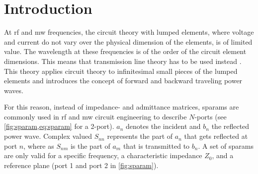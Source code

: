 \documentclass[12pt,a4paper,parskip=full,abstract=true,BCOR=10mm,twoside,open=right]{scrreprt}
\begin{document}
\renewcommand{\abstractname}{Acknowledgements}
\begin{abstract}
    \lipsum[1]
\end{abstract}

\tableofcontents

\chapter{Introduction}
\label{chap:introduction}

At \gls{rf} and \gls{mw} frequencies, the circuit theory with lumped elements, where
voltage and current do not vary over the physical dimension of the elements, is of limited
value. The wavelength at these frequencies is of the order of the circuit
element dimensions. This means that transmission line theory has to be used instead \cite{pozar_mw_engineering_2011}.
This theory applies circuit theory to infinitesimal small pieces of the lumped elements
and introduces the concept of forward and backward traveling power waves.

For this reason, instead of impedance- and admittance matrices, \glspl{sparam}
are commonly used in \gls{rf} and \gls{mw} circuit engineering to describe
$N$-ports (see \cref{fig:sparam,eq:sparam} for a 2-port). $a_n$ denotes the incident and
$b_n$ the reflected power wave. Complex valued $S_{nn}$ represents the
part of $a_n$ that gets reflected at port $n$, where as $S_{nm}$ is the part of $a_m$ that
is transmitted to $b_n$. A set of \glspl{sparam} are only valid for a specific frequency, a
characteristic impedance $Z_0$, and a reference plane (port 1 and port 2 in \cref{fig:sparam}).
\end{document}
